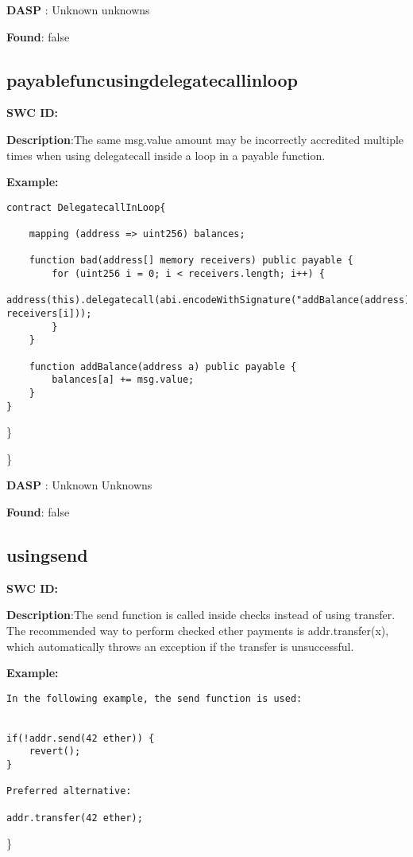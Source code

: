 \documentclass{article}
\begin{document}
\textbf{DASP} : Unknown unknowns

\textbf{Found}: false

\subsection{payable\textunderscore func\textunderscore using\textunderscore delegatecall\textunderscore in\textunderscore loop} 
\textbf{SWC \textunderscore ID:} 

\textbf{Description}:The same msg.value amount may be incorrectly accredited multiple times when using delegatecall inside a loop in a payable function.


\textbf{Example:} 
\begin{verbatim}
contract DelegatecallInLoop{

    mapping (address => uint256) balances;

    function bad(address[] memory receivers) public payable {
        for (uint256 i = 0; i < receivers.length; i++) {
            address(this).delegatecall(abi.encodeWithSignature("addBalance(address)", receivers[i]));
        }
    }

    function addBalance(address a) public payable {
        balances[a] += msg.value;
    }
}

\end{verbatim}\} 

\} 

\textbf{DASP} : Unknown Unknowns

\textbf{Found}: false

\subsection{using\textunderscore send} 
\textbf{SWC \textunderscore ID:} 

\textbf{Description}:The send function is called inside checks instead of using transfer. The recommended way to perform checked ether payments is addr.transfer(x), which automatically throws an exception if the transfer is unsuccessful.


\textbf{Example:} 
\begin{verbatim}
In the following example, the send function is used:


if(!addr.send(42 ether)) {
    revert();
}

Preferred alternative:

addr.transfer(42 ether);

\end{verbatim}\} 
\end{document}
